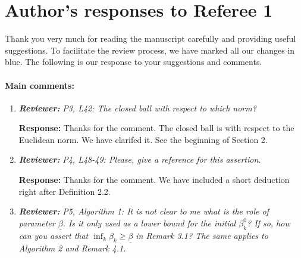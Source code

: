 \documentclass{article}
\begin{document}
\section*{Author's responses to Referee 1}
Thank you very much for reading the manuscript carefully and providing useful suggestions. To facilitate the review process, we have marked all our changes in blue.  The following is our response to your suggestions and comments.

\paragraph{Main comments:}
\begin{enumerate}
	\item  \textit{\textbf{Reviewer:}} \textit{P3, L42: The closed ball with respect to which norm?}
	
	\textbf{Response:} Thanks for the comment. The closed ball is with respect to the Euclidean norm. We have clarifed it. See the beginning of Section 2.

	\item  \textit{\textbf{Reviewer:}} \textit{P4, L48-49: Please, give a reference for this assertion.}
	
	\textbf{Response:} Thanks for the comment. We have included a short deduction right after Definition 2.2.

	\item  \textit{\textbf{Reviewer:}} \textit{P5, Algorithm 1: It is not clear to me what is the role of parameter $\underline{\beta}$. Is it only used as a lower bound for the initial $\beta_k^0$? If so, how can you assert that $\inf_k \beta_k \ge \underline{\beta}$ in Remark 3.1? The same applies to Algorithm 2 and Remark 4.1.}
	

\end{enumerate}
\end{document}
